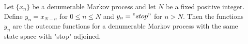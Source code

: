 Let $\{x_n\}$ be a denumerable Markov process and let $N$ be a fixed positive integer. Define $y_n = x_{N-n}$ for $0 \leq n \leq N$ and $y_n = "stop"$ for $n > N$. Then the functions $y_n$ are the outcome functions for a denumerable Markov process with the same state space with "stop" adjoined.
